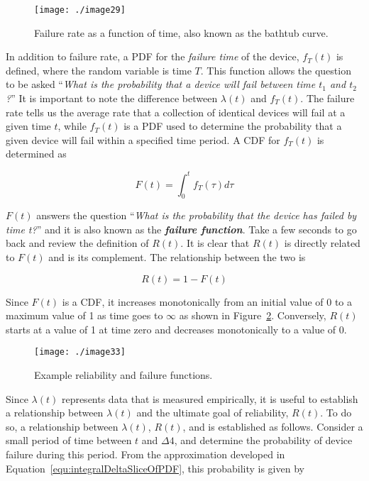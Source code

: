 {\begin{figure}[h]
\centering
\texttt{[image: ./image29]}
\caption{Failure rate as a function of time, also known as
the bathtub curve.}
\label{figure:bathtubFunction}
\end{figure}

In addition to failure rate, a PDF for the \emph{failure time} of the
device, $f_T(t)$ is defined, where the
random variable is time $T$. This function allows the question to
be asked ``\emph{What is the probability that a device will fail between
time $t_1$ and $t_2$?}'' It is important to
note the difference between $\lambda(t)$ and
$f_T(t)$. The failure rate tells us the
average rate that a collection of identical devices will fail at a given
time $t$, while $f_T(t)$ is a PDF
used to determine the probability that a given device will fail within a
specified time period. A CDF for $f_T(t)$
is determined as

\begin{equation}
\label{equ:integralDeltaSliceOfPDF}
F(t) = \int_{0}^{t} f_T(\tau) d\tau
\end{equation}

$F(t)$ answers the question ``\emph{What is the probability that
the device has failed by time t?}'' and it is also known as the
\emph{\textbf{failure function}}. Take a few seconds to go back and
review the definition of $R(t)$. It is clear that $R(t)$ is
directly related to $F(t)$ and is its complement. The relationship
between the two is

\begin{equation}
\label{equ:integralDeltaSliceOfPDF}
R(t) = 1 - F(t)
\end{equation}


Since $F(t)$ is a CDF, it increases monotonically from an initial
value of 0 to a maximum value of 1 as time goes to $\infty$ as shown in 
Figure~\ref{figure:reliabilityAndFailure}. 
Conversely, $R(t)$ starts at a value of 1 at time zero and
decreases monotonically to a value of 0.


\begin{figure}[h]
\centering
\texttt{[image: ./image33]}
\caption{Example reliability and failure functions.}
\label{figure:reliabilityAndFailure}
\end{figure}

Since $\lambda(t)$ represents data that is measured empirically, it is
useful to establish a relationship between $\lambda(t)$ and the ultimate
goal of reliability, $R(t)$. To do so, a relationship between
$\lambda(t)$, $R(t)$, and  is
established as follows. Consider a small period of time between $t$
and $\Delta 4$, and determine the
probability of device failure during this period. From the approximation
developed in 
Equation~\ref{equ:integralDeltaSliceOfPDF}, this probability is given by

}
